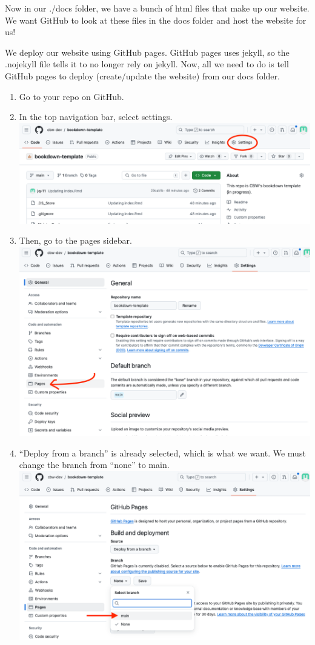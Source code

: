 \documentclass[
]{book}
\theoremstyle{definition}
\theoremstyle{definition}
\theoremstyle{definition}
\theoremstyle{definition}
\theoremstyle{remark}
\begin{document}
Now in our ./docs folder, we have a bunch of html files that make up our website. We want GitHub to look at these files in the docs folder and host the website for us!

We deploy our website using GitHub pages. GitHub pages uses jekyll, so the .nojekyll file tells it to no longer rely on jekyll. Now, all we need to do is tell GitHub pages to deploy (create/update the website) from our docs folder.

\begin{enumerate}
\def\labelenumi{\arabic{enumi}.}
\item
  Go to your repo on GitHub.
\item
  In the top navigation bar, select settings.
  \includegraphics{img/git-instruct/github-settings.png}
\item
  Then, go to the pages sidebar.
  \includegraphics{img/git-instruct/github-select-pages.png}
\item
  ``Deploy from a branch'' is already selected, which is what we want. We must change the branch from ``none'' to main.
  \includegraphics{img/git-instruct/github-deploy-main.png}

\end{enumerate}
\end{document}
